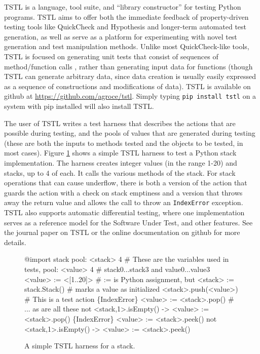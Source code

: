 TSTL \cite{tstlsttt,NFM15,ISSTA15} is a language, tool suite, and
``library constructor'' for testing Python programs.  TSTL aims to
offer both the immediate feedback of property-driven testing tools
like QuickCheck and Hypothesis \cite{ClaessenH00,hypothesis} and
longer-term automated test generation, as well as serve as a platform
for experimenting with novel test generation and test manipulation
methods.   Unlike most QuickCheck-like tools, TSTL is focused on
generating unit tests that consist of sequences of method/function
calls \cite{AndrewsTR}, rather than generating input data for functions (though TSTL
can generate arbitrary data, since data creation is usually easily
expressed as a sequence of constructions and modifications of data).
TSTL is available on github at
\url{https://github.com/agroce/tstl}.  Simply typing {\tt pip
  install tstl} on a system with pip installed will also install TSTL.

The user of TSTL writes a test harness \cite{WODACommon} that describes
the actions that are possible during testing, and the pools of values
that are generated during testing (these are both the inputs to
methods tested and the objects to be tested, in most cases).  Figure
\ref{fig:stack} shows a simple TSTL harness to test a Python stack
implementation.  The harness creates integer values (in the range
1-20) and stacks, up to 4 of each.  It calls the various methods of
the stack.  For stack operations that can cause underflow, there is
both a version of the action that guards the action with a check on
stack emptiness and a version that throws away the return value and
allows the call to throw an {\tt IndexError} exception.  TSTL also
supports automatic differential \cite{Differential} testing, where one implementation
serves as a reference model for the Software Under Test, and other
features.  See the journal paper on TSTL \cite{tstlsttt} or the online
documentation on github for more details.

\begin{figure}
{\scriptsize
\begin{code}
@import stack
\vspace{0.1in}
pool: <stack> 4        \# These are the variables used in tests,
pool: <value> 4        \# stack0...stack3 and value0...value3
\vspace{0.1in}
<value> := <[1..20]>       \# := is Python assignment, but
<stack> := stack.Stack()   \# marks a value  as initialized
\vspace{0.1in}
<stack>.push(<value>) \# This is a test action
\{IndexError\} <value> := <stack>.pop() \# ... as are all these
not <stack,1>.isEmpty() -> <value> := <stack>.pop()
\{IndexError\} <value> := <stack>.peek() 
not <stack,1>.isEmpty() -> <value> := <stack>.peek()
\end{code}
}
\caption{A simple TSTL harness for a stack.}
\label{fig:stack}
\end{figure}

